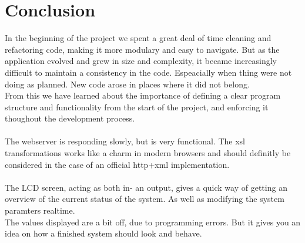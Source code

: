 \chapter{Conclusion}
\label{chap:conclusion}
In the beginning of the project we spent a great deal of time cleaning and refactoring code, making it more modulary and easy to navigate. But as the application evolved and grew in size and complexity, it became increasingly difficult to maintain a consistency in the code. Espeacially when thing were not doing as planned. New code arose in places where it did not belong.\\
From this we have learned about the importance of defining a clear program structure and functionality from the start of the project, and enforcing it thoughout the development process.\\\\
The webserver is responding slowly, but is very functional. The xsl transformations works like a charm in modern browsers and should definitly be considered in the case of an official http+xml implementation.\\\\
The LCD screen, acting as both in- an output, gives a quick way of getting an overview of the current status of the system. As well as modifying the system paramters realtime.\\ The values displayed are a bit off, due to programming errors. But it gives you an idea on how a finished system should look and behave.
